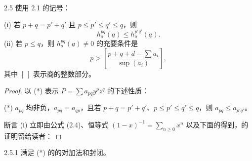 \begin{SGAresult}{}{2.5}
使用 2.1 的记号：

(i) 若 $p+q=p'+q'$ 且 $p\leq p'\leq q'\leq q$，则
\[
 h_o^{pq}(\underline a)\leq h_o^{p'q'}(\underline a).
\]
(ii) 若 $p\leq q$，则 $h_o^{pq}(\underline a)\ne0$ 的充要条件是
\[
 p>\left[\frac{p+q+d-\sum a_i}{\sup(a_i)}\right],
\]
其中 $[\ ]$ 表示商的整数部分。
\end{SGAresult}
\begin{proof}
以 (*) 表示 $P=\sum a_{pq}y^pz^q$ 的下述性质：

(*) $a_{pq}$ 均非负，$a_{pq}=a_{qp}$，且若 $p+q=p'+q'$、$p\leq p'\leq q'\leq q$，则 $a_{pq}\leq a_{p'q'}$。

断言 (i) 立即由公式 (2.4)、恒等式 $(1-x)^{-1}=\sum_{n\geq0}x^n$ 以及下面的得到，的证明留给读者：
\end{proof}
\begin{SGAresult}{}{2.5.1}
满足 (*) 的的对加法和封闭。
\end{SGAresult}
